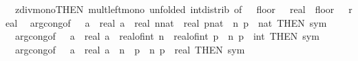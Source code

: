 \begin{isabellebody}
\ \ zdiv{\isacharunderscore}{\kern0pt}mono{}{\isacharbrackleft}{\kern0pt}THEN\ mult{\isacharunderscore}{\kern0pt}left{\isacharunderscore}{\kern0pt}mono{\isacharcomma}{\kern0pt}\ unfolded\ int{\isacharunderscore}{\kern0pt}distrib{\isacharcomma}{\kern0pt}\ of\ {\isacharunderscore}{\kern0pt}\ {\isacharunderscore}{\kern0pt}\ {\isacartoucheopen}floor\ {\isacharparenleft}{\kern0pt}{\isacharunderscore}{\kern0pt}\ {\isacharcolon}{\kern0pt}{\isacharcolon}{\kern0pt}\ real{\isacharparenright}{\kern0pt}{\isacartoucheclose}\ \ {\isacartoucheopen}floor\ {\isacharparenleft}{\kern0pt}{\isacharunderscore}{\kern0pt}\ {\isacharcolon}{\kern0pt}{\isacharcolon}{\kern0pt}\ real{\isacharparenright}{\kern0pt}{\isacartoucheclose}{\isacharbrackright}{\kern0pt}\isanewline
\ \ arg{\isacharunderscore}{\kern0pt}cong{\isacharbrackleft}{\kern0pt}of\ {\isacharunderscore}{\kern0pt}\ {\isacharunderscore}{\kern0pt}\ {\isacartoucheopen}{\isasymlambda}a\ {\isacharcolon}{\kern0pt}{\isacharcolon}{\kern0pt}\ real{\isachardot}{\kern0pt}\ a\ {\isacharslash}{\kern0pt}\ real\ {\isacharparenleft}{\kern0pt}n{\isacharcolon}{\kern0pt}{\isacharcolon}{\kern0pt}nat{\isacharparenright}{\kern0pt}\ {\isacharasterisk}{\kern0pt}\ real\ {\isacharparenleft}{\kern0pt}p{\isacharcolon}{\kern0pt}{\isacharcolon}{\kern0pt}nat{\isacharparenright}{\kern0pt}{\isacartoucheclose}\ \ n\ p\ {\isacharcolon}{\kern0pt}{\isacharcolon}{\kern0pt}\ nat{\isacharcomma}{\kern0pt}\ THEN\ sym{\isacharbrackright}{\kern0pt}\isanewline
\ \ arg{\isacharunderscore}{\kern0pt}cong{\isacharbrackleft}{\kern0pt}of\ {\isacharunderscore}{\kern0pt}\ {\isacharunderscore}{\kern0pt}\ {\isacartoucheopen}{\isasymlambda}a\ {\isacharcolon}{\kern0pt}{\isacharcolon}{\kern0pt}\ real{\isachardot}{\kern0pt}\ a\ {\isacharslash}{\kern0pt}\ real{\isacharunderscore}{\kern0pt}of{\isacharunderscore}{\kern0pt}int\ n\ {\isacharasterisk}{\kern0pt}\ real{\isacharunderscore}{\kern0pt}of{\isacharunderscore}{\kern0pt}int\ p{\isacartoucheclose}\ \ n\ p\ {\isacharcolon}{\kern0pt}{\isacharcolon}{\kern0pt}\ int{\isacharcomma}{\kern0pt}\ THEN\ sym{\isacharbrackright}{\kern0pt}\isanewline
\ \ arg{\isacharunderscore}{\kern0pt}cong{\isacharbrackleft}{\kern0pt}of\ {\isacharunderscore}{\kern0pt}\ {\isacharunderscore}{\kern0pt}\ {\isacartoucheopen}{\isasymlambda}a\ {\isacharcolon}{\kern0pt}{\isacharcolon}{\kern0pt}\ real{\isachardot}{\kern0pt}\ a\ {\isacharslash}{\kern0pt}\ n\ {\isacharasterisk}{\kern0pt}\ p{\isacartoucheclose}\ \ n\ p\ {\isacharcolon}{\kern0pt}{\isacharcolon}{\kern0pt}\ real{\isacharcomma}{\kern0pt}\ THEN\ sym{\isacharbrackright}{\kern0pt}\isanewline

\end{isabellebody}
